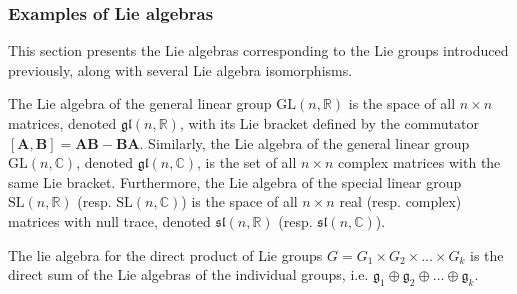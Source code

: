 \subsubsection{Examples of Lie algebras}
This section presents the Lie algebras corresponding to the Lie groups introduced previously, along with several Lie algebra isomorphisms.
\begin{example}
    The Lie algebra of the general linear group $\text{GL}(n, \mathbb{R})$ is the space of all $n\times n$ matrices, denoted $\mathfrak{gl}(n, \mathbb{R})$, with its Lie bracket defined by the commutator $[\mathbf{A}, \mathbf{B}] = \mathbf{A}\mathbf{B} - \mathbf{B}\mathbf{A}$. Similarly, the Lie algebra of the general linear group $\text{GL}(n, \mathbb{C})$, denoted $\mathfrak{gl}(n, \mathbb{C})$, is the set of all $n\times n$ complex matrices with the same Lie bracket. Furthermore, the Lie algebra of the special linear group $\text{SL}(n, \mathbb{R})$ (resp. $\text{SL}(n, \mathbb{C})$) is the space of all $n\times n$ real (resp. complex) matrices with null trace, denoted $\mathfrak{sl}(n, \mathbb{R})$ (resp. $\mathfrak{sl}(n, \mathbb{C})$).
\end{example}
\begin{example}
    The lie algebra for the direct product of Lie groups $G=G_1 \times G_2 \times \dots \times G_k$ is the direct sum of the Lie algebras of the individual groups, i.e. $\mathfrak{g}_1\oplus\mathfrak{g}_2\oplus\dots\oplus\mathfrak{g}_k$.
\end{example}
